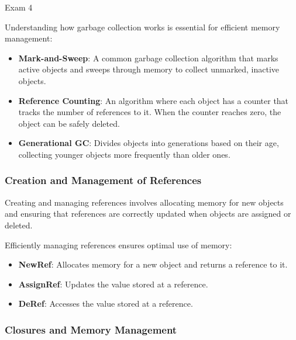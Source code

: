 \begin{examnotes}{Exam 4}
    \begin{highlight}
        Understanding how garbage collection works is essential for efficient memory management:
        \begin{itemize}
            \item \textbf{Mark-and-Sweep}: A common garbage collection algorithm that marks active objects and sweeps through memory to collect unmarked, inactive objects.
            \item \textbf{Reference Counting}: An algorithm where each object has a counter that tracks the number of references to it. When the counter reaches zero, the object can be safely deleted.
            \item \textbf{Generational GC}: Divides objects into generations based on their age, collecting younger objects more frequently than older ones.
        \end{itemize}
    \end{highlight}
    
    \subsubsection*{Creation and Management of References}
    
    Creating and managing references involves allocating memory for new objects and ensuring that references are correctly updated when objects are assigned or deleted.
    
    \begin{highlight}
        Efficiently managing references ensures optimal use of memory:
        \begin{itemize}
            \item \textbf{NewRef}: Allocates memory for a new object and returns a reference to it.
            \item \textbf{AssignRef}: Updates the value stored at a reference.
            \item \textbf{DeRef}: Accesses the value stored at a reference.
        \end{itemize}
    \end{highlight}
    
    \subsubsection*{Closures and Memory Management}
    

\end{examnotes}
